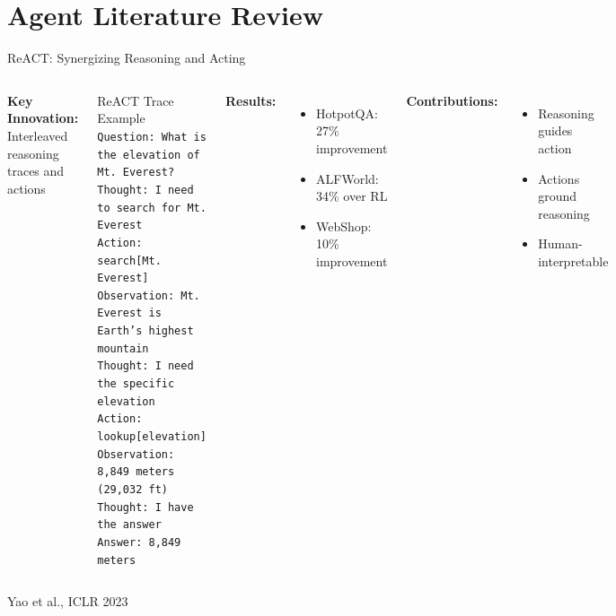 \documentclass[aspectratio=169]{beamer}
\begin{document}
\section{Agent Literature Review}

\begin{frame}{ReACT: Synergizing Reasoning and Acting}
	\begin{columns}
		\textbf{Key Innovation:} Interleaved reasoning traces and actions
		
		\begin{block}{ReACT Trace Example}
			\footnotesize
			\texttt{Question: What is the elevation of Mt. Everest?}\\
			\texttt{Thought: I need to search for Mt. Everest}\\
			\texttt{Action: search[Mt. Everest]}\\
			\texttt{Observation: Mt. Everest is Earth's highest mountain}\\
			\texttt{Thought: I need the specific elevation}\\
			\texttt{Action: lookup[elevation]}\\
			\texttt{Observation: 8,849 meters (29,032 ft)}\\
			\texttt{Thought: I have the answer}\\
			\texttt{Answer: 8,849 meters}
		\end{block}
		
		\textbf{Results:}
		\begin{itemize}
			\item HotpotQA: {\color{highlight}27\% improvement}
			\item ALFWorld: {\color{highlight}34\% over RL}
			\item WebShop: {\color{highlight}10\% improvement}
		\end{itemize}
		
		\textbf{Contributions:}
		\begin{itemize}
			\item Reasoning guides action
			\item Actions ground reasoning
			\item Human-interpretable
		\end{itemize}
	\end{columns}
	
	\vspace{0.2cm}
	\small
	Yao et al., ICLR 2023
\end{frame}
\end{document}
